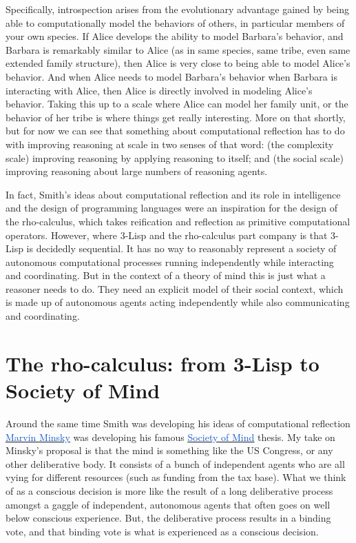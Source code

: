 \documentclass[10pt]{report}
\begin{document}
\vspace{1\baselineskip}
Specifically, introspection arises from the evolutionary advantage gained by being able to computationally model the behaviors of others, in particular members of your own species. If Alice develops the ability to model Barbara’s behavior, and Barbara is remarkably similar to Alice (as in same species, same tribe, even same extended family structure), then Alice is very close to being able to model Alice’s behavior. And when Alice needs to model Barbara’s behavior when Barbara is interacting with Alice, then Alice is directly involved in modeling Alice’s behavior. Taking this up to a scale where Alice can model her family unit, or the behavior of her tribe is where things get really interesting. More on that shortly, but for now we can see that something about computational reflection has to do with improving reasoning at scale in two senses of that word: (the complexity scale) improving reasoning by applying reasoning to itself; and (the social scale) improving reasoning about large numbers of reasoning agents.

\vspace{1\baselineskip}
In fact, Smith’s ideas about computational reflection and its role in intelligence and the design of programming languages were an inspiration for the design of the rho-calculus, which takes reification and reflection as primitive computational operators. However, where 3-Lisp and the rho-calculus part company is that 3-Lisp is decidedly sequential. It has no way to reasonably represent a society of autonomous computational processes running independently while interacting and coordinating. But in the context of a theory of mind this is just what a reasoner needs to do. They need an explicit model of their social context, which is made up of autonomous agents acting independently while also communicating and coordinating.

\vspace{1\baselineskip}
\section{The rho-calculus: from 3-Lisp to Society of Mind}

\vspace{1\baselineskip}
Around the same time Smith was developing his ideas of computational reflection \href{https://en.wikipedia.org/wiki/Marvin_Minsky}{\uline{\textcolor[HTML]{1155CC}{Marvin Minsky}}} was developing his famous \href{https://en.wikipedia.org/wiki/Society_of_Mind}{\uline{\textcolor[HTML]{1155CC}{Society of Mind}}} thesis. My take on Minsky’s proposal is that the mind is something like the US Congress, or any other deliberative body. It consists of a bunch of independent agents who are all vying for different resources (such as funding from the tax base). What we think of as a conscious decision is more like the result of a long deliberative process amongst a gaggle of independent, autonomous agents that often goes on well below conscious experience. But, the deliberative process results in a binding vote, and that binding vote is what is experienced as a conscious decision.
\end{document}
